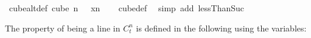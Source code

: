 \begin{isabellebody}
\isamarkupfalse%
\ cube{}{\isacharunderscore}{\kern0pt}alt{\isacharunderscore}{\kern0pt}def{\isacharcolon}{\kern0pt}\ {\isachardoublequoteopen}cube\ n\ {}\ {\isacharequal}{\kern0pt}\ {\isacharbraceleft}{\kern0pt}{\isasymlambda}x{\isasymin}{\isacharbraceleft}{\kern0pt}{\isachardot}{\kern0pt}{\isachardot}{\kern0pt}{\isacharless}{\kern0pt}n{\isacharbraceright}{\kern0pt}{\isachardot}{\kern0pt}\ {}{\isacharbraceright}{\kern0pt}{\isachardoublequoteclose}%
\isadelimproof
\ %
\endisadelimproof
%
\isatagproof
{}\isamarkupfalse%
\ cube{\isacharunderscore}{\kern0pt}def\ \isamarkupfalse%
\ {\isacharparenleft}{\kern0pt}simp\ add{\isacharcolon}{\kern0pt}\ lessThan{\isacharunderscore}{\kern0pt}Suc{\isacharparenright}{\kern0pt}%
\endisatagproof
{\isafoldproof}%
%
\isadelimproof
%
\endisadelimproof
%
\isadelimdocument
%
\endisadelimdocument
%
\isatagdocument
%
\isamarkuptrue%
%
\endisatagdocument
{\isafolddocument}%
%
\isadelimdocument
%
\endisadelimdocument
%
\begin{isamarkuptext}%
The property of being a line in $C^n_t$ is defined in the following using the variables:


\end{isamarkuptext}
\end{isabellebody}
